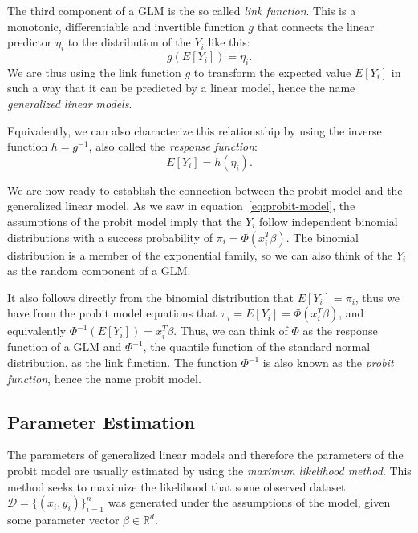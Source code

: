 The third component of a GLM is the so called \textit{link function}.
This is a monotonic, differentiable and invertible function
$g$
that connects the linear predictor $\eta_i$ to the distribution of the
$Y_i$ like this:
\begin{equation*}
    g(E[Y_i]) = \eta_i.
\end{equation*}
We are thus using the link function $g$ to transform the expected value
$E[Y_i]$ in such a way that it can be predicted by a linear model,
hence the name \textit{generalized linear models}.

Equivalently, we can also characterize this relationsthip by using
the inverse function $h = g^{-1}$,
also called the \textit{response function}:
\begin{equation*}
    E[Y_i] = h(\eta_i).
\end{equation*}

We are now ready to establish the connection between the probit model and
the generalized linear model.
As we saw in equation~\ref{eq:probit-model}, the assumptions of the
probit model imply that the $Y_i$ follow independent binomial distributions
with a success probability of $\pi_i = \Phi(x_i^T \beta)$.
The binomial distribution is a member of the exponential family, so
we can also think of the $Y_i$ as the random component of a GLM.

It also follows directly from the binomial distribution that
$E[Y_i] = \pi_i$, thus we have from the probit model equations that
$\pi_i = E[Y_i] = \Phi(x_i^T \beta)$, and equivalently
$\Phi^{-1}(E[Y_i]) = x_i^T \beta$. Thus, we can think of $\Phi$ as the response
function of a GLM and $\Phi^{-1}$, the quantile function
of the standard normal distribution, as the link function.
The function $\Phi^{-1}$ is also known as the \textit{probit function},
hence the name probit model.

\subsection{Parameter Estimation}
\label{sec:parameter-estimation}

The parameters of generalized linear models and therefore the parameters
of the probit model are usually
estimated by using the \textit{maximum likelihood method}.
This method seeks to maximize the likelihood that some observed
dataset $\mathcal{D} = \{(x_i, y_i)\}_{i=1}^n$ was generated under the
assumptions of the model, given some parameter vector
$\beta \in \mathbb{R}^d$.

